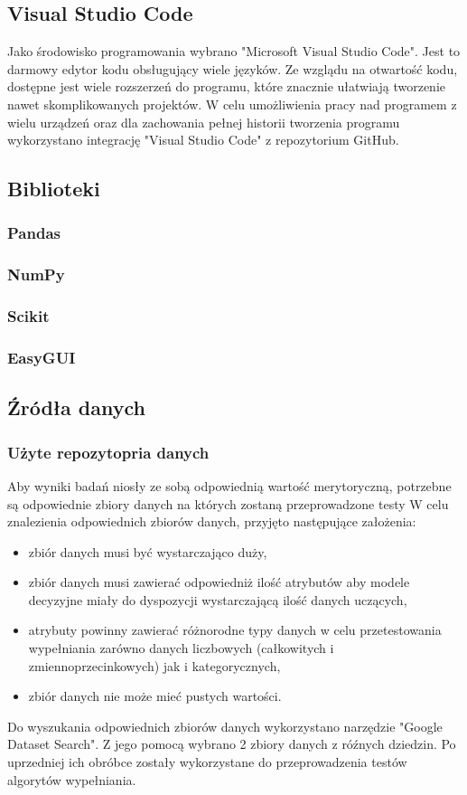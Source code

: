 \documentclass[12pt,twoside]{article}
\begin{document}
\subsection{Visual Studio Code}

Jako środowisko programowania wybrano "Microsoft Visual Studio Code".
Jest to darmowy edytor kodu obsługujący wiele języków.
Ze wzglądu na otwartość kodu, dostępne jest wiele rozszerzeń do programu,
które znacznie ułatwiają tworzenie nawet skomplikowanych projektów.
W celu umożliwienia pracy nad programem z wielu urządzeń
oraz dla zachowania pełnej historii tworzenia programu wykorzystano integrację "Visual Studio Code" z repozytorium GitHub.
\subsection{Biblioteki}
\subsubsection{Pandas}
\subsubsection{NumPy}
\subsubsection{Scikit}
\subsubsection{EasyGUI}
\subsection{Źródła danych}

\subsubsection{Użyte repozytopria danych}

Aby wyniki badań niosły ze sobą odpowiednią wartość merytoryczną,
potrzebne są odpowiednie zbiory danych na których zostaną przeprowadzone testy
W celu znalezienia odpowiednich zbiorów danych, przyjęto następujące założenia:
\begin{itemize}[label=-,labelsep=0.4cm, leftmargin=1.25cm]
    \item zbiór danych musi być wystarczająco duży,
    \item zbiór danych musi zawierać odpowiedniż ilość atrybutów aby modele decyzyjne miały
    do dyspozycji wystarczającą ilość danych uczących,
    \item atrybuty powinny zawierać różnorodne typy danych w celu przetestowania wypełniania zarówno danych
    liczbowych (całkowitych i zmiennoprzecinkowych) jak i kategorycznych,
    \item zbiór danych nie może mieć pustych wartości.
\end{itemize}
Do wyszukania odpowiednich zbiorów danych wykorzystano narzędzie "Google Dataset Search".
Z jego pomocą wybrano 2 zbiory danych z róźnych dziedzin.
Po uprzedniej ich obróbce zostały wykorzystane do przeprowadzenia testów algorytów wypełniania.
\end{document}
